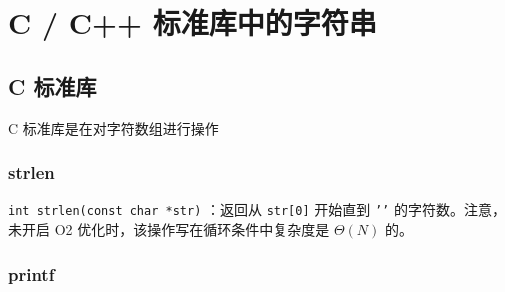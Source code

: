 
\section{C / C++ 标准库中的字符串}

\subsection{C 标准库}

C 标准库是在对字符数组进行操作

\subsubsection{strlen}

\texttt{int strlen(const char *str)} ：返回从 \texttt{str[0]} 开始直到 \texttt{'\0'} 的字符数。注意，未开启 O2 优化时，该操作写在循环条件中复杂度是 $\Theta(N)$ 的。

\subsubsection{printf}


